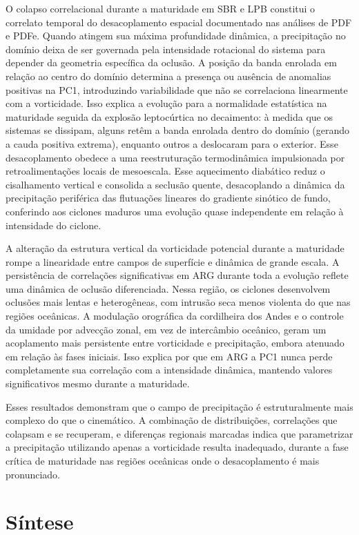 O colapso correlacional durante a maturidade em SBR e LPB constitui o correlato temporal do desacoplamento espacial documentado nas análises de PDF e PDFe.
Quando atingem sua máxima profundidade dinâmica, a precipitação no domínio deixa de ser governada pela intensidade rotacional do sistema para depender da geometria específica da oclusão.
A posição da banda enrolada em relação ao centro do domínio determina a presença ou ausência de anomalias positivas na PC1, introduzindo variabilidade que não se correlaciona linearmente com a vorticidade.
Isso explica a evolução para a normalidade estatística na maturidade seguida da explosão leptocúrtica no decaimento: à medida que os sistemas se dissipam, alguns retêm a banda enrolada dentro do domínio (gerando a cauda positiva extrema), enquanto outros a deslocaram para o exterior.
Esse desacoplamento obedece a uma reestruturação termodinâmica impulsionada por retroalimentações locais de mesoescala.
Esse aquecimento diabático reduz o cisalhamento vertical e consolida a seclusão quente, desacoplando a dinâmica da precipitação periférica das flutuações lineares do gradiente sinótico de fundo, conferindo aos ciclones maduros uma evolução quase independente em relação à intensidade do ciclone.

A alteração da estrutura vertical da vorticidade potencial durante a maturidade rompe a linearidade entre campos de superfície e dinâmica de grande escala.
A persistência de correlações significativas em ARG durante toda a evolução reflete uma dinâmica de oclusão diferenciada.
Nessa região, os ciclones desenvolvem oclusões mais lentas e heterogêneas, com intrusão seca menos violenta do que nas regiões oceânicas.
A modulação orográfica da cordilheira dos Andes e o controle da umidade por advecção zonal, em vez de intercâmbio oceânico, geram um acoplamento mais persistente entre vorticidade e precipitação, embora atenuado em relação às fases iniciais.
Isso explica por que em ARG a PC1 nunca perde completamente sua correlação com a intensidade dinâmica, mantendo valores significativos mesmo durante a maturidade.

Esses resultados demonstram que o campo de precipitação é estruturalmente mais complexo do que o cinemático. A combinação de distribuições, correlações que colapsam e se recuperam, e diferenças regionais marcadas indica que parametrizar a precipitação utilizando apenas a vorticidade resulta inadequado, durante a fase crítica de maturidade nas regiões oceânicas onde o desacoplamento é mais pronunciado.

\section{Síntese}\label{sec:sintesis_tp}


